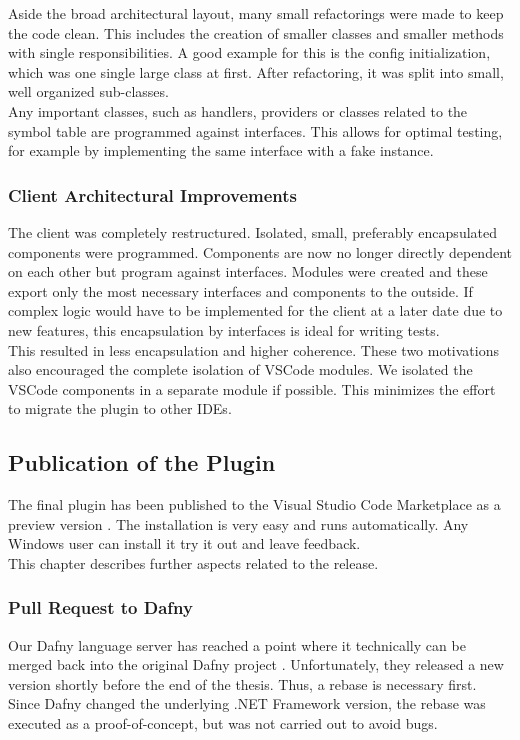 Aside the broad architectural layout, many small refactorings were made to keep the code clean.
This includes the creation of smaller classes and smaller methods with single responsibilities.
A good example for this is the config initialization, which was one single large class at first.
After refactoring, it was split into small, well organized sub-classes.\\

Any important classes, such as handlers, providers or classes related to the symbol table are programmed against interfaces.
This allows for optimal testing, for example by implementing the same interface with a fake instance.

\subsubsection{Client Architectural Improvements}
The client was completely restructured.
Isolated, small, preferably encapsulated components were programmed.
Components are now no longer directly dependent on each other but program against interfaces.
Modules were created and these export only the most necessary interfaces and components to the outside.
If complex logic would have to be implemented for the client at a later date due to new features,
this encapsulation by interfaces is ideal for writing tests. \\

This resulted in less encapsulation and higher coherence.
These two motivations also encouraged the complete isolation of VSCode modules.
We isolated the VSCode components in a separate module if possible.
This minimizes the effort to migrate the plugin to other IDEs.


\subsection{Publication of the Plugin}
The final plugin has been published to the Visual Studio Code Marketplace as a preview version \cite{our-dafny-plugin}.
The installation is very easy and runs automatically.
Any Windows user can install it \textendash{} try it out and leave feedback.\\

This chapter describes further aspects related to the release.

\subsubsection{Pull Request to Dafny}
Our Dafny language server has reached a point where it technically can be merged back into the original Dafny project \cite{dafny_lang_github}.
Unfortunately, they released a new version shortly before the end of the thesis.
Thus, a rebase is necessary first.
Since Dafny changed the underlying .NET Framework version, the rebase was executed as a proof-of-concept, but was not carried out to avoid bugs.\\

